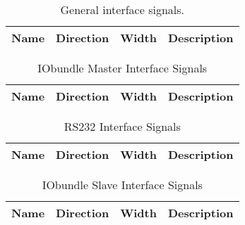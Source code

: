 \begin{table}[H]
  \centering
  \begin{tabular}{|l|l|r|p{10.5cm}|}

    \hline
    \rowcolor{iob-green}
    {\bf Name} & {\bf Direction} & {\bf Width} & {\bf Description}  \\ \hline \hline

    

  \end{tabular}
  \caption{General interface signals.}
  \label{gen_if_tab:is}
\end{table}

\begin{table}[H]
  \centering
  \begin{tabular}{|l|l|r|p{8.5cm}|}

    \hline
    \rowcolor{iob-green}
    {\bf Name} & {\bf Direction} & {\bf Width} & {\bf Description}  \\ \hline \hline

    

  \end{tabular}
  \caption{IObundle Master Interface Signals}
  \label{tab:if_iob_s}
\end{table}

\begin{table}[H]
  \centering
  \begin{tabular}{|l|l|r|p{9.5cm}|}
    
    \hline
    \rowcolor{iob-green}
    {\bf Name} & {\bf Direction} & {\bf Width} & {\bf Description}  \\ \hline \hline

    
 
  \end{tabular}
  \caption{RS232 Interface Signals}
  \label{tab:if_cs_io}
\end{table}

\begin{table}[H]
  \centering
  \begin{tabular}{|l|l|r|p{8.5cm}|}

    \hline
    \rowcolor{iob-green}
    {\bf Name} & {\bf Direction} & {\bf Width} & {\bf Description}  \\ \hline \hline

    

  \end{tabular}
  \caption{IObundle Slave Interface Signals}
  \label{tab:if_iob_s}
\end{table}
